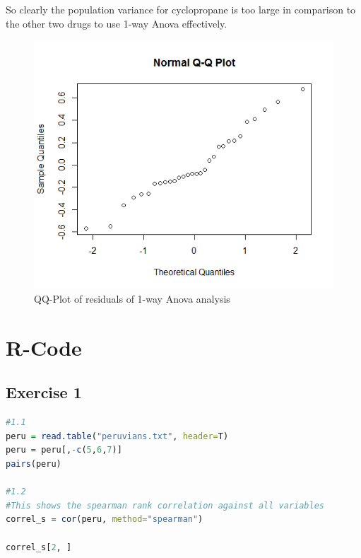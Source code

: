 \documentclass{article}
\begin{document}
    So clearly the population variance for cyclopropane is too large in comparison to the other two drugs to use 1-way Anova effectively.

    \begin{figure}[H]
    \centering
      \includegraphics[scale=0.3]{../results/4_5.png}
      \caption{QQ-Plot of residuals of 1-way Anova analysis}
      \label{fig:dog-resid}
    \end{figure}
    
    \section{R-Code}
    \subsection{Exercise 1}\label{sec:RE1}
      \begin{lstlisting}[language=R]
      #1.1
peru = read.table("peruvians.txt", header=T)
peru = peru[,-c(5,6,7)]
pairs(peru)

#1.2
#This shows the spearman rank correlation against all variables
correl_s = cor(peru, method="spearman")

correl_s[2, ]
      \end{lstlisting}
\end{document}
